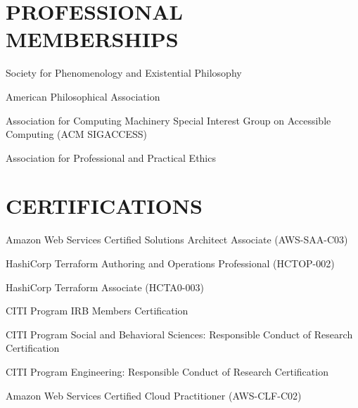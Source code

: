 \documentclass{article}
\newcommand{\listitemspace}{0.25em}
\renewenvironment{itemize}
{\begin{list}{}{\setlength{\leftmargin}{0em}
                \setlength{\parskip}{0em}
                \setlength{\itemsep}{\listitemspace}
                \setlength{\parsep}{\listitemspace}}}
{\end{list}}
\begin{document}
\section*{\normalsize{PROFESSIONAL MEMBERSHIPS}}
\begin{itemize}
    \item Society for Phenomenology and Existential Philosophy
    \item American Philosophical Association
    \item Association for Computing Machinery \textemdash{} Special Interest Group on Accessible Computing (ACM SIGACCESS)
    \item Association for Professional and Practical Ethics
\end{itemize}


\section*{\normalsize{CERTIFICATIONS}}
\begin{itemize}
    \item Amazon Web Services Certified Solutions Architect Associate (AWS-SAA-C03)
    \item HashiCorp Terraform Authoring and Operations Professional (HCTOP-002)
    \item HashiCorp Terraform Associate (HCTA0-003)
    \item CITI Program IRB Members Certification
    \item CITI Program Social and Behavioral Sciences: Responsible Conduct of Research Certification
    \item CITI Program Engineering: Responsible Conduct of Research Certification
    \item Amazon Web Services Certified Cloud Practitioner (AWS-CLF-C02)
\end{itemize}
\end{document}
